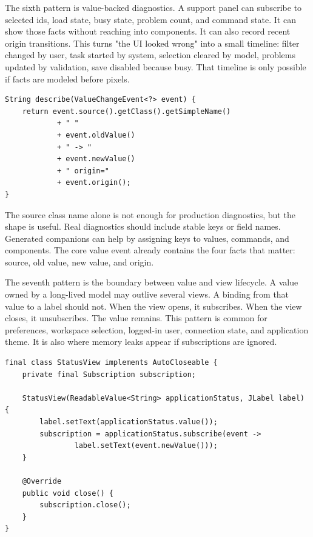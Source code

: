 The sixth pattern is value-backed diagnostics. A support panel can subscribe to
selected ids, load state, busy state, problem count, and command state. It can
show those facts without reaching into components. It can also record recent
origin transitions. This turns "the UI looked wrong" into a small timeline:
filter changed by user, task started by system, selection cleared by model,
problems updated by validation, save disabled because busy. That timeline is
only possible if facts are modeled before pixels.

\begin{lstlisting}[caption={A tiny diagnostic event line from a value change.}]
String describe(ValueChangeEvent<?> event) {
    return event.source().getClass().getSimpleName()
            + " "
            + event.oldValue()
            + " -> "
            + event.newValue()
            + " origin="
            + event.origin();
}
\end{lstlisting}

The source class name alone is not enough for production diagnostics, but the
shape is useful. Real diagnostics should include stable keys or field names.
Generated companions can help by assigning keys to values, commands, and
components. The core value event already contains the four facts that matter:
source, old value, new value, and origin.

The seventh pattern is the boundary between value and view lifecycle. A value
owned by a long-lived model may outlive several views. A binding from that value
to a label should not. When the view opens, it subscribes. When the view closes,
it unsubscribes. The value remains. This pattern is common for preferences,
workspace selection, logged-in user, connection state, and application theme.
It is also where memory leaks appear if subscriptions are ignored.

\begin{lstlisting}[caption={Long-lived value, short-lived view subscription.}]
final class StatusView implements AutoCloseable {
    private final Subscription subscription;

    StatusView(ReadableValue<String> applicationStatus, JLabel label) {
        label.setText(applicationStatus.value());
        subscription = applicationStatus.subscribe(event ->
                label.setText(event.newValue()));
    }

    @Override
    public void close() {
        subscription.close();
    }
}
\end{lstlisting}

